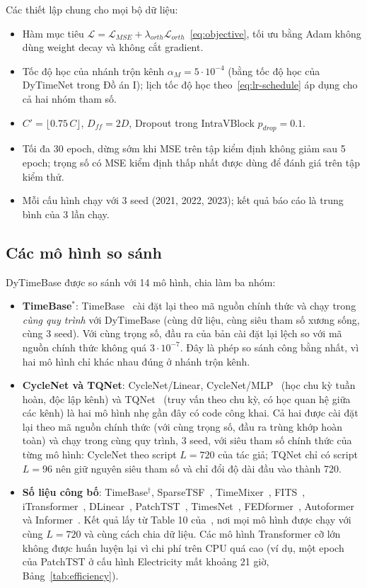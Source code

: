 \documentclass[12pt,a4paper]{report}
\numberwithin{equation}{chapter}
\begin{document}
Các thiết lập chung cho mọi bộ dữ liệu:
\begin{itemize}
  \item Hàm mục tiêu $\mathcal{L}=\mathcal{L}_{MSE}+\lambda_{orth}\mathcal{L}_{orth}$~\eqref{eq:objective}, tối ưu bằng Adam
        không dùng weight decay và không cắt gradient.
  \item Tốc độ học của nhánh trộn kênh $\alpha_M=5\cdot10^{-4}$ (bằng tốc độ học của DyTimeNet trong Đồ án I); lịch tốc
        độ học theo~\eqref{eq:lr-schedule} áp dụng cho cả hai nhóm tham số.
  \item $C'=\lfloor 0.75\,C\rfloor$, $D_{ff}=2D$, Dropout trong IntraVBlock $p_{drop}=0.1$.
  \item Tối đa 30 epoch, dừng sớm khi MSE trên tập kiểm định không giảm sau 5 epoch; trọng số có MSE kiểm định thấp nhất
        được dùng để đánh giá trên tập kiểm thử.
  \item Mỗi cấu hình chạy với 3 seed (2021, 2022, 2023); kết quả báo cáo là trung bình của 3 lần chạy.
\end{itemize}

\subsection{Các mô hình so sánh}

DyTimeBase được so sánh với 14 mô hình, chia làm ba nhóm:
\begin{itemize}
  \item \textbf{TimeBase$^{*}$}: TimeBase~\cite{timebase} cài đặt lại theo mã nguồn chính thức và chạy trong \emph{cùng quy
        trình} với DyTimeBase (cùng dữ liệu, cùng siêu tham số xương sống, cùng 3 seed). Với cùng trọng số, đầu ra của bản
        cài đặt lại lệch so với mã nguồn chính thức không quá $3\cdot10^{-7}$. Đây là phép so sánh công bằng nhất, vì hai mô
        hình chỉ khác nhau đúng ở nhánh trộn kênh.
  \item \textbf{CycleNet và TQNet}: CycleNet/Linear, CycleNet/MLP~\cite{cyclenet} (học chu kỳ tuần hoàn, độc lập kênh) và
        TQNet~\cite{tqnet} (truy vấn theo chu kỳ, có học quan hệ giữa các kênh) là hai mô hình nhẹ gần đây có code công
        khai. Cả hai được cài đặt lại theo mã nguồn chính thức (với cùng trọng số, đầu ra trùng khớp hoàn toàn) và chạy
        trong cùng quy trình, 3 seed, với siêu tham số chính thức của từng mô hình: CycleNet theo script $L=720$ của tác
        giả; TQNet chỉ có script $L=96$ nên giữ nguyên siêu tham số và chỉ đổi độ dài đầu vào thành 720.
  \item \textbf{Số liệu công bố}: TimeBase$^{\dagger}$, SparseTSF~\cite{sparsetsf}, TimeMixer~\cite{timemixer},
        FITS~\cite{fits}, iTransformer~\cite{itransformer}, DLinear~\cite{dlinear}, PatchTST~\cite{patchtst},
        TimesNet~\cite{timesnet}, FEDformer~\cite{fedformer}, Autoformer~\cite{autoformer} và Informer~\cite{informer}. Kết
        quả lấy từ Table 10 của~\cite{timebase}, nơi mọi mô hình được chạy với cùng $L=720$ và cùng cách chia dữ liệu.
        Các mô hình Transformer cỡ lớn không được huấn luyện lại vì chi phí trên CPU quá cao (ví dụ, một epoch của
        PatchTST ở cấu hình Electricity mất khoảng 21 giờ, Bảng~\ref{tab:efficiency}).
\end{itemize}
\end{document}
